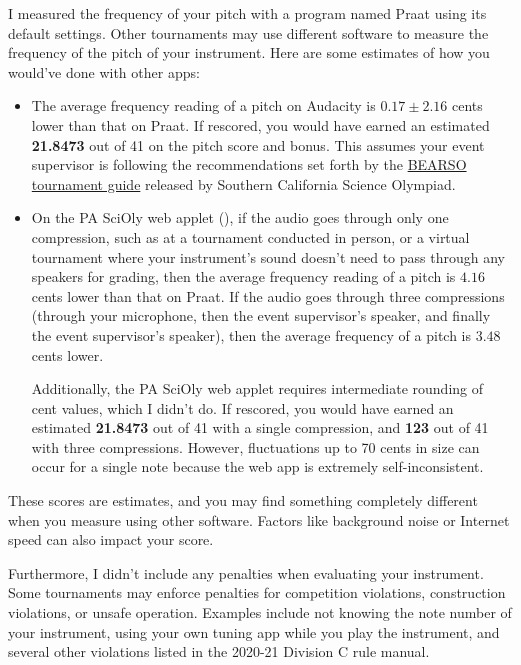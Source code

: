 \documentclass[12pt,letterpaper]{article}
\def\audacityEstimate{21.8473}
\def\pasciolyEstimate{21.8473}
\def\pasciolyEstimateTC{123}
\begin{document}
I measured the frequency of your pitch with a program named Praat using its default settings. Other tournaments may use different software to measure the frequency of the pitch of your instrument. Here are some estimates of how you would've done with other apps:
\begin{itemize}
\item The average frequency reading of a pitch on Audacity is $0.17\pm2.16
$ cents lower than that on Praat. If rescored, you would have earned an estimated \textbf{\audacityEstimate} out of 41 on the pitch score and bonus. This assumes your event supervisor is following the recommendations set forth by the \href{https://docs.google.com/document/d/1VBmM2NzHvc5F2ZHKz4Warf_NGrkn1ADL1Gx0DPHVrJ4/edit#bookmark=id.lu1jk8vh7g7z}{BEARSO tournament guide} released by Southern California Science Olympiad.


\item On the PA SciOly web applet (), if the audio goes through only one compression, such as at a tournament conducted in person, or a virtual tournament where your instrument's sound doesn't need to pass through any speakers for grading, then the average frequency reading of a pitch is $4.16$ cents lower than that on Praat.  If the audio goes through three compressions (through your microphone, then the event supervisor's speaker, and finally the event supervisor's speaker), then the average frequency of a pitch is $3.48$ cents lower.

Additionally, the PA SciOly web applet requires intermediate rounding of cent values, which I didn't do. If rescored, you would have earned an estimated \textbf{\pasciolyEstimate} out of 41 with a single compression, and \textbf{\pasciolyEstimateTC} out of 41 with three compressions. However, fluctuations up to 70 cents in size can occur for a single note because the web app is extremely self-inconsistent.
\end{itemize}
These scores are estimates, and you may find something completely different when you measure using other software. Factors like background noise or Internet speed can also impact your score.

Furthermore, I didn't include any penalties when evaluating your instrument. Some tournaments may enforce penalties for competition violations, construction violations, or unsafe operation. Examples include not knowing the note number of your instrument, using your own tuning app while you play the instrument, and several other violations listed in the 2020-21 Division C rule manual.
\end{document}
